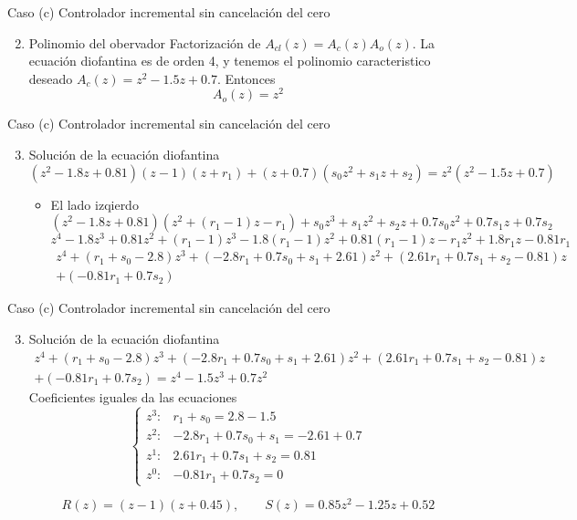 \documentclass[presentation,aspectratio=169]{beamer}
\begin{document}
\begin{frame}[label={sec:org418e1c9}]{Caso (c) Controlador incremental sin cancelación del cero}
\begin{enumerate}
\setcounter{enumi}{1}
\item \alert{Polinomio del obervador} Factorización de \(A_{cl}(z) = A_c(z)A_o(z)\). La ecuación diofantina es de orden 4, y tenemos el polinomio caracteristico deseado \(A_c(z) = z^2 -1.5z + 0.7\). Entonces \alert{\[A_o(z) = z^2\]}
\end{enumerate}
\end{frame}

\begin{frame}[label={sec:orgcc0eb56}]{Caso (c) Controlador incremental sin cancelación del cero}
\begin{enumerate}
\setcounter{enumi}{2}
\item \alert{Solución de la ecuación diofantina} 
\[(z^2 - 1.8z + 0.81)(z-1)(z+r_1) + (z+0.7)(s_0z^2 + s_1z + s_2) = z^2(z^2-1.5z+0.7) \]
\begin{itemize}
\item El lado izqierdo
\[(z^2 - 1.8z + 0.81)(z^2 +(r_1-1)z - r_1) + s_0z^3 + s_1z^2 + s_2z + 0.7s_0z^2 + 0.7s_1z + 0.7s_2\] 
\[z^4 - 1.8z^3 + 0.81z^2 + (r_1-1)z^3 - 1.8(r_1-1)z^2 + 0.81(r_1-1)z - r_1z^2 + 1.8r_1z - 0.81r_1 \]
\begin{multline*}
z^4 + (r_1 + s_0 -2.8)z^3 + (-2.8r_1 + 0.7s_0 + s_1 +2.61)z^2 + (2.61 r_1 + 0.7s_1 + s_2 -0.81)z\\   + (-0.81r_1 + 0.7s_2)\end{multline*}
\end{itemize}
\end{enumerate}
\end{frame}

\begin{frame}[label={sec:orgbc9400b}]{Caso (c) Controlador incremental sin cancelación del cero}
\begin{enumerate}
\setcounter{enumi}{2}
\item \alert{Solución de la ecuación diofantina} 
\begin{multline*}
  z^4 + (r_1 + s_0 -2.8)z^3 + (-2.8r_1 + 0.7s_0 + s_1 +2.61)z^2 + (2.61 r_1 + 0.7s_1 + s_2 -0.81)z\\   + (-0.81r_1 + 0.7s_2) = z^4 -1.5z^3 + 0.7z^2\end{multline*} 
Coeficientes iguales da las ecuaciones
\[ \begin{cases} z^3: & r_1 + s_0 = 2.8 -1.5\\
              z^2: & -2.8 r_1 + 0.7s_0 + s_1 = -2.61 +0.7\\
              z^1: &  2.61r_1 + 0.7s_1 + s_2 = 0.81\\
              z^0: & -0.81r_1 + 0.7s_2 = 0  \end{cases} \]

\alert{\[ R(z) = (z-1)(z + 0.45), \qquad S(z) = 0.85z^2 - 1.25z + 0.52\]}
\end{enumerate}
\end{frame}
\end{document}
